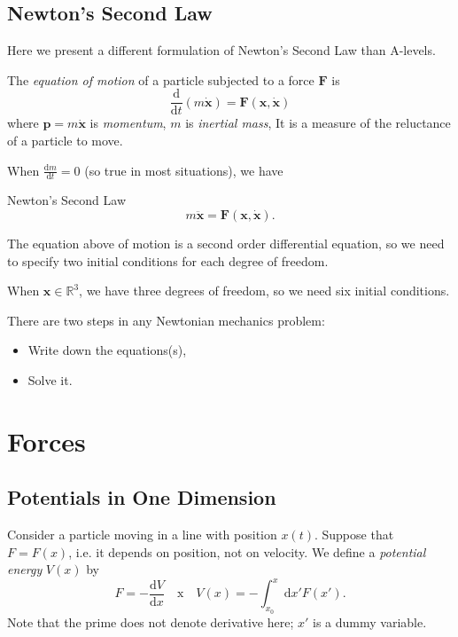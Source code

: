 \subsection{Newton's Second Law}
Here we present a different formulation of Newton's Second Law than A-levels.

\begin{definition}{}{}
    The \textit{equation of motion} of a particle subjected to a force \(\mathbf{F} \) is
    \[
        \frac{\mathrm{d}}{\mathrm{d}t} (m \dot{\mathbf{x}}) = \mathbf{F} (\mathbf{x}, \dot{\mathbf{x}})
    \]
    where \(\mathbf{p} = m \dot{\mathbf{x}}\) is \textit{momentum}, \(m\) is \textit{inertial mass}, It is a measure of the reluctance of a particle to move.
\end{definition}

When \(\frac{\mathrm{d}m}{\mathrm{d}t} = 0\) (so true in most situations), we have
\begin{theorem}{Newton's Second Law}{}
    \[
        m\ddot{\mathbf{x}} = \mathbf{F} (\mathbf{x}, \dot{\mathbf{x}}).
    \]
\end{theorem}
The equation above of motion is a second order differential equation, so we need to specify two initial conditions for each degree of freedom.

\begin{example}
    When \(\mathbf{x} \in \mathbb{R}^3\), we have three degrees of freedom, so we need six initial conditions. 
\end{example}

There are two steps in any Newtonian mechanics problem:
\begin{itemize}
    \item Write down the equations(s),
    \item Solve it.
\end{itemize}

\section{Forces}
\subsection{Potentials in One Dimension}
Consider a particle moving in a line with position \(x(t)\). Suppose that \(F = F(x)\), i.e. it depends on position, not on velocity. We define a \textit{potential energy} \(V(x)\) by
\[
    F = -\frac{\mathrm{d}V}{\mathrm{d}x} \quad \text{x} \quad V(x) = - \int_{x_0}^{x}\mathrm{d}x'F(x').
\]
Note that the prime does not denote derivative here; \(x'\) is a dummy variable.

